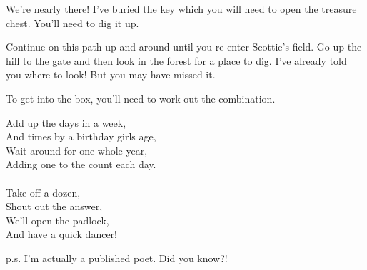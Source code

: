 \documentclass[a5paper, 10pt]{article}
\newcommand{\paragap}{\vspace*{3mm}}
\begin{document}
\begin{minipage}{0.6\textwidth}

We're nearly there! I've buried the key which you will need to open the treasure chest.
You'll need to dig it up.

\paragap

Continue on this path up and around until you re-enter Scottie's field.
Go up the hill to the gate and then look in the forest for a place to dig.
I've already told you where to look! But you may have missed it.

\paragap

To get into the box, you'll need to work out the combination.

\paragap

\begin{riddle}
Add up the days in a week,\\
And times by a birthday girls age,\\
Wait around for one whole year,\\
Adding one to the count each day.\\
\\
Take off a dozen,\\
Shout out the answer,\\
We'll open the padlock,\\
And have a quick dancer!
\end{riddle}


\paragap

\initials

{\tiny p.s. I'm actually a published poet. Did you know?!}
\end{minipage}
\end{document}
